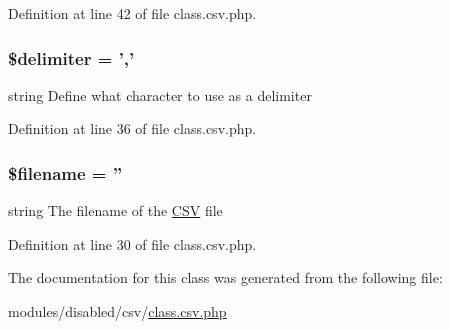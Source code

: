 Definition at line 42 of file class.\-csv.\-php.

\hypertarget{class_c_s_v_a40acc7b8c08cfbb456cd9444cb0e8f61}{
\subsubsection[{\$delimiter}]{\setlength{\rightskip}{0pt plus 5cm}\$delimiter = ','}}\label{class_c_s_v_a40acc7b8c08cfbb456cd9444cb0e8f61}
string Define what character to use as a delimiter 

Definition at line 36 of file class.\-csv.\-php.

\hypertarget{class_c_s_v_a0722441477f957078ee2437054556cbc}{
\subsubsection[{\$filename}]{\setlength{\rightskip}{0pt plus 5cm}\$filename = ''}}\label{class_c_s_v_a0722441477f957078ee2437054556cbc}
string The filename of the \hyperlink{class_c_s_v}{C\-S\-V} file 

Definition at line 30 of file class.\-csv.\-php.



The documentation for this class was generated from the following file\-:\begin{DoxyCompactItemize}
\item 
modules/disabled/csv/\hyperlink{class_8csv_8php}{class.\-csv.\-php}\end{DoxyCompactItemize}
